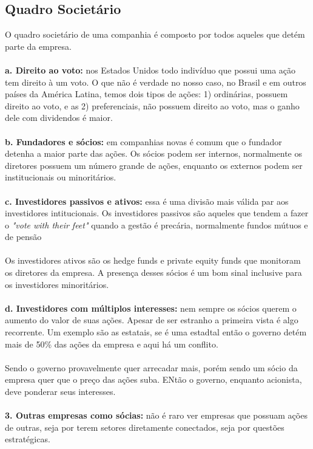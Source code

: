 \subsection*{Quadro Societário}
O quadro societário de uma companhia é composto por todos aqueles que detém parte da empresa.
\\~\\
\textbf{a. Direito ao voto:} nos Estados Unidos todo indivíduo que possui uma ação tem direito à um voto. O que não é verdade no nosso caso, no Brasil e em outros países da América Latina, temos dois tipos de ações: 1) ordinárias, possuem direito ao voto, e as 2) preferenciais, não possuem direito ao voto, mas o ganho dele com dividendos é maior.
\\~\\
\textbf{b. Fundadores e sócios:} em companhias novas é comum que o fundador detenha a maior parte das ações. Os sócios podem ser internos, normalmente os diretores possuem um número grande de ações, enquanto os externos podem ser institucionais ou minoritários.
\\~\\
\textbf{c. Investidores passivos e ativos:} essa é uma divisão mais válida par aos investidores intitucionais. Os investidores passivos são aqueles que tendem a fazer o \textit{"vote with their feet"} quando a gestão é precária, normalmente fundos mútuos e de pensão
\\~\\
 Os investidores ativos são os hedge funds e private equity funds que monitoram os diretores da empresa. A presença desses sócios é um bom sinal inclusive para os investidores minoritários.
\\~\\
\textbf{d. Investidores com múltiplos interesses:} nem sempre os sócios querem o aumento do valor de suas ações. Apesar de ser estranho a primeira vista é algo recorrente. Um exemplo são as estatais, se é uma estadtal então o governo detém mais de 50\% das ações da empresa e aqui há um conflito.
\\~\\
Sendo o governo provavelmente quer arrecadar mais, porém sendo um sócio da empresa quer que o preço das ações suba. ENtão o governo, enquanto acionista, deve ponderar seus interesses.
\\~\\
\textbf{3. Outras empresas como sócias:} não é raro ver empresas que possuam ações de outras, seja por terem setores diretamente conectados, seja por questões estratégicas.
